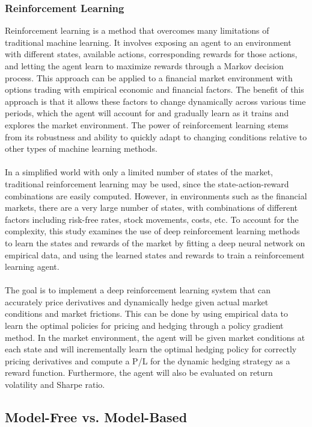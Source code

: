 \subsubsection{Reinforcement Learning}
Reinforcement learning is a method that overcomes many limitations of traditional machine learning. It involves exposing an agent to an environment with different states, available actions, corresponding rewards for those actions, and letting the agent learn to maximize rewards through a Markov decision process. This approach can be applied to a financial market environment with options trading with empirical economic and financial factors. The benefit of this approach is that it allows these factors to change dynamically across various time periods, which the agent will account for and gradually learn as it trains and explores the market environment. The power of reinforcement learning stems from its robustness and ability to quickly adapt to changing conditions relative to other types of machine learning methods.
\\
\\
In a simplified world with only a limited number of states of the market, traditional reinforcement learning may be used, since the state-action-reward combinations are easily computed. However, in environments such as the financial markets, there are a very large number of states, with combinations of different factors including risk-free rates, stock movements, costs, etc. To account for the complexity, this study examines the use of deep reinforcement learning methods to learn the states and rewards of the market by fitting a deep neural network on empirical data, and using the learned states and rewards to train a reinforcement learning agent.
\\
\\
The goal is to implement a deep reinforcement learning system that can accurately price derivatives and dynamically hedge given actual market conditions and market frictions. This can be done by using empirical data to learn the optimal policies for pricing and hedging through a policy gradient method. In the market environment, the agent will be given market conditions at each state and will incrementally learn the optimal hedging policy for correctly pricing derivatives and compute a P/L for the dynamic hedging strategy as a reward function. Furthermore, the agent will also be evaluated on return volatility and Sharpe ratio.

\subsection{Model-Free vs. Model-Based}

